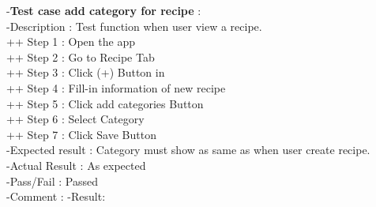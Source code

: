 \documentclass{article}
\begin{document}
 -\textbf{Test case add category for recipe }: \\
    -Description : Test function when user view a recipe. \\
    ++ Step 1 : Open the app  \\
    ++ Step 2 : Go to Recipe Tab \\
    ++ Step 3 : Click (+) Button in  \\
    ++ Step 4 : Fill-in information of new recipe \\
    ++ Step 5 : Click add categories Button  \\
    ++ Step 6 : Select Category  \\
    ++ Step 7 : Click Save Button \\
    -Expected result : Category must show as same as when user create recipe. \\
    -Actual Result : As expected \\
    -Pass/Fail : Passed \\
    -Comment : 
    -Result:
\end{document}
